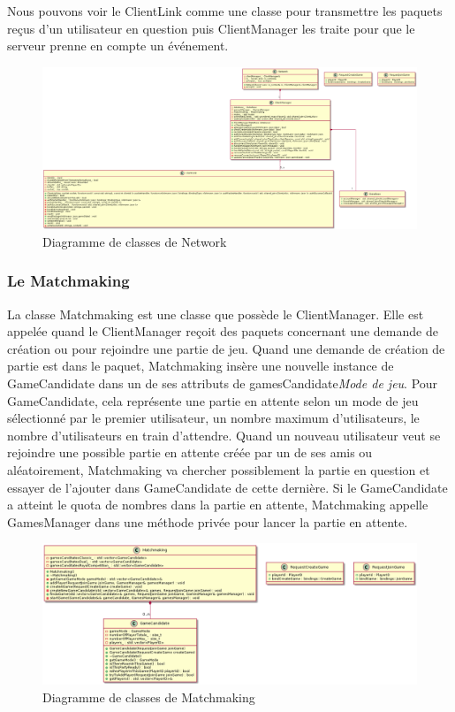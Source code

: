 \documentclass{article}
\begin{document}
Nous pouvons voir le ClientLink comme une classe pour transmettre les paquets reçus d'un utilisateur en question puis ClientManager les traite pour que le serveur prenne en compte un événement.

\begin{figure}[H]
	\centering
	 \includegraphics[scale=0.2]{../res/uml/class/NetworkClass.png}
	 \caption{Diagramme de classes de Network}
	 \label{fig:NetworkDiagram}
\end{figure}

\subsubsection{Le Matchmaking}

La classe Matchmaking est une classe que possède le ClientManager. Elle est appelée quand le ClientManager reçoit des paquets concernant une demande de création ou pour rejoindre une partie de jeu. Quand une demande de création de partie est dans le paquet, Matchmaking insère une nouvelle instance de GameCandidate dans un de ses attributs de gamesCandidate\textit{Mode de jeu}. Pour GameCandidate, cela représente une partie en attente selon un mode de jeu sélectionné par le premier utilisateur, un nombre maximum d'utilisateurs, le nombre d'utilisateurs en train d'attendre. Quand un nouveau utilisateur veut se rejoindre une possible partie en attente créée par un de ses amis ou aléatoirement, Matchmaking va chercher possiblement la partie en question et essayer de l'ajouter dans GameCandidate de cette dernière. Si le GameCandidate a atteint le quota de nombres dans la partie en attente, Matchmaking appelle GamesManager dans une méthode privée pour lancer la partie en attente. 

\begin{figure}[H]
	\centering
	 \includegraphics[scale=0.4]{../res/uml/class/MatchMakingClass.png}
	 \caption{Diagramme de classes de Matchmaking}
	 \label{fig:MatchmakingDiagram}
\end{figure}
\end{document}
